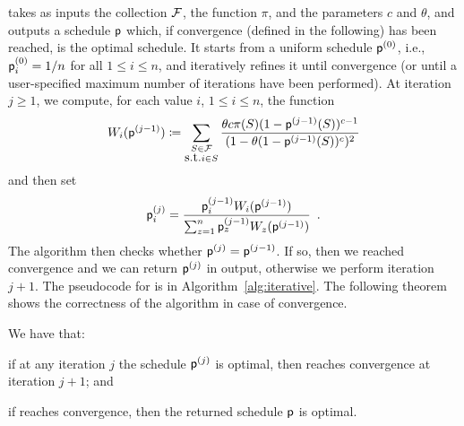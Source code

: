 \algoname takes as inputs the collection $\mathcal{F}$, the function $\pi$, and the
parameters $c$ and $\theta$, and outputs a schedule $\mathsf{p}$ which, if
convergence (defined in the following) has been reached, is the optimal
schedule. It starts from a uniform schedule $\mathsf{p}^{(0)}$, i.e.,
$\mathsf{p}^{(0)}_i=1/n$ for all $1\le i\le n$, and iteratively refines it until
convergence (or until a user-specified maximum number of iterations have been
performed). At iteration $j\ge 1$, we compute, for each value $i$, $1\le i\le
n$, the function
\begin{equation}\label{eq:functionw}
	W_i(\mathsf{p}^{(j-1)}) \coloneqq \sum_{\substack{S \in \mathcal{F} \\ \mbox{s.t.} i\in
S}} \frac{\theta c \pi(S)
	(1-\mathsf{p}^{(j-1)}(S))^{c-1}}{(1-\theta(1-\mathsf{p}^{(j-1)}(S))^c)^2}
\end{equation}
and then set
\[
	\mathsf{p}^{(j)}_i = \frac{\mathsf{p}^{(j-1)}_i W_i(\mathsf{p}^{(j-1)})}{\sum_{z=1}^n
	\mathsf{p}^{(j-1)}_z W_z(\mathsf{p}^{(j-1)})}\enspace.
\]
The algorithm then checks whether $\mathsf{p}^{(j)}=\mathsf{p}^{(j-1)}$. If so, then we
reached convergence and we can return $\mathsf{p}^{(j)}$ in output, otherwise we
perform iteration $j+1$. The pseudocode for \algoname is in
Algorithm~\ref{alg:iterative}. The following theorem shows the correctness of
the algorithm in case of convergence.

\begin{theorem}\label{thm:optimal}
	We have that:
	\begin{enumerate*}
		\item if at any iteration $j$ the schedule $\mathsf{p}^{(j)}$ is optimal,
			then \algoname reaches convergence at iteration $j+1$; and
		\item if \algoname reaches convergence, then the returned schedule
			$\mathsf{p}$ is optimal.
	\end{enumerate*}
\end{theorem}

